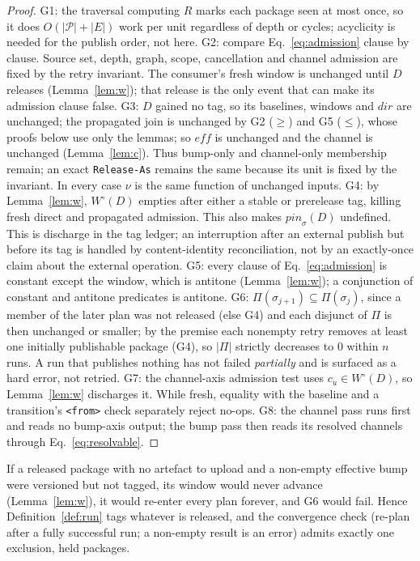 \documentclass[sigconf,nonacm]{acmart}
\newcommand{\code}[1]{\texttt{#1}}
\newcommand{\G}[1]{G#1}
\begin{document}
\begin{proof}
\G{1}: the traversal computing $R$ marks each package seen at most
once, so it does $O(|\mathcal{P}|{+}|E|)$ work per unit regardless of
depth or cycles; acyclicity is needed for the publish order, not here.
\G{2}: compare Eq.~\ref{eq:admission} clause by clause. Source set,
depth, graph, scope, cancellation and channel admission are fixed by the
retry invariant. The consumer's fresh window is unchanged until $D$
releases (Lemma~\ref{lem:w}); that release is the only event that can
make its admission clause false.
\G{3}: $D$ gained no tag, so its baselines, windows and
$\mathit{dir}$ are unchanged; the propagated join is unchanged by \G{2}
($\geq$) and \G{5} ($\leq$), whose proofs below use only the lemmas; so
$\mathit{eff}$ is unchanged and the channel is unchanged
(Lemma~\ref{lem:c}). Thus bump-only and channel-only membership remain;
an exact \code{Release-As} remains the same because its unit is fixed by the
invariant. In every case $\nu$ is the same function of unchanged inputs.
\G{4}: by Lemma~\ref{lem:w}, $W^\circ(D)$ empties after either a stable
or prerelease tag, killing fresh direct and propagated admission. This
also makes $\mathit{pin}_\sigma(D)$ undefined. This is discharge in the tag
ledger; an interruption after an external publish
but before its tag is handled by content-identity reconciliation, not by
an exactly-once claim about the external operation.
\G{5}: every clause of Eq.~\ref{eq:admission} is constant except the
window, which is antitone (Lemma~\ref{lem:w}); a conjunction of
constant and antitone predicates is antitone.
\G{6}: $\Pi(\sigma_{j+1}) \subseteq \Pi(\sigma_j)$, since a member of
the later plan was not released (else \G{4}) and each disjunct of
$\Pi$ is then unchanged or smaller; by the premise each nonempty retry
removes at least one initially publishable package (\G{4}), so $|\Pi|$
strictly decreases to $0$ within
$n$ runs. A run that publishes nothing has not failed \emph{partially}
and is surfaced as a hard error, not retried.
\G{7}: the channel-axis admission test uses $c_u\in W^\circ(D)$, so
Lemma~\ref{lem:w} discharges it. While fresh, equality with the baseline
and a transition's \code{<from>} check separately reject no-ops.
\G{8}: the channel pass runs first and reads no bump-axis output; the bump
pass then reads its resolved channels through Eq.~\ref{eq:resolvable}.
\end{proof}

\begin{proposition}
\label{prop:tagall}
If a released package with no artefact to upload and a non-empty effective
bump were versioned but not tagged, its window would never advance
(Lemma~\ref{lem:w}), it would re-enter every plan forever, and \G{6} would
fail. Hence
Definition~\ref{def:run} tags whatever is released, and the
convergence check (re-plan after a fully successful run; a non-empty
result is an error) admits exactly one exclusion, held packages.
\end{proposition}
\end{document}
